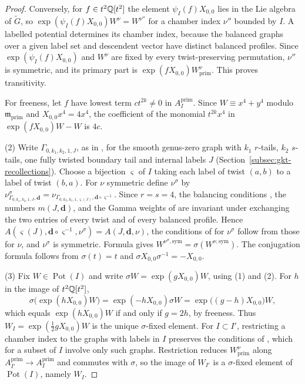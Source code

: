 \begin{proof}
Conversely, for $f\in t^2\mathbb Q[t^2]$ the element $\psi_I(f)X_{0,0}$ lies in the
Lie algebra of $\widetilde G$, so $\exp(\psi_I(f)X_{0,0})W^\nu=W^{\nu''}$ for a
chamber index $\nu''$ bounded by $I$.  A labelled potential determines its
chamber index, because the balanced graphs over a given label set and
descendent vector have distinct balanced profiles.  Since
$\exp(\psi_I(f)X_{0,0})$ and $W^\nu$ are fixed by every twist-preserving
permutation, $\nu''$ is symmetric, and its primary part is
$\exp(fX_{0,0})W^\nu_{\mathrm{prim}}$.  This proves transitivity.

For freeness, let $f$ have lowest term $ct^{2k}\neq0$ in
$A^{\mathrm{prim}}_I$.  Since $W\equiv x^4+y^4$ modulo
$\mathfrak m_{\mathrm{prim}}$ and $X_{0,0}x^4=4x^4$, the coefficient of the
monomial $t^{2k}x^4$ in $\exp(fX_{0,0})W-W$ is $4c$.

(2) Write $\Gamma_{0,k_1,k_2,1,J}$, as in
\cite[Notation~2.27]{grossetal2022open}, for the smooth genus-zero graph with
$k_1$ $r$-tails, $k_2$ $s$-tails, one fully twisted boundary tail and
internal labels $J$ (Section~\ref{subsec:gkt-recollections}).  Choose a
bijection $\varsigma$ of $I$ taking each label of twist $(a,b)$ to a label of
twist $(b,a)$.  For $\nu$ symmetric define $\nu^\sigma$ by
$\nu^\sigma_{\Gamma_{0,k_1,k_2,1,J},\mathbf d}
=\nu_{\Gamma_{0,k_2,k_1,1,\varsigma(J)},\mathbf d\circ\varsigma^{-1}}$.  Since
$r=s=4$, the balancing conditions \cite[Prop.~2.31]{grossetal2022open}, the
numbers $m(J,\mathbf d)$, and the Gamma weights of
\cite[Notation~3.42]{grossetal2022open} are invariant under exchanging the two
entries of every twist and of every balanced profile.  Hence
$A(\varsigma(J),\mathbf d\circ\varsigma^{-1},\nu^\sigma)=A(J,\mathbf d,\nu)$,
the conditions of \cite[Def.~3.47]{grossetal2022open} for $\nu^\sigma$ follow
from those for $\nu$, and $\nu^\sigma$ is symmetric.  Formula
\cite[(4.11)]{grossetal2022open} gives
$W^{\nu^\sigma,\mathrm{sym}}=\sigma(W^{\nu,\mathrm{sym}})$.  The conjugation
formula follows from $\sigma(t)=t$ and $\sigma X_{0,0}\sigma^{-1}=-X_{0,0}$.

(3) Fix $W\in\operatorname{Pot}(I)$ and write $\sigma W=\exp(gX_{0,0})W$, using (1)
and (2).  For $h$ in the image of $t^2\mathbb Q[t^2]$,
\[
 \sigma\bigl(\exp(hX_{0,0})W\bigr)
 =\exp(-hX_{0,0})\sigma W
 =\exp\bigl((g-h)X_{0,0}\bigr)W,
\]
which equals $\exp(hX_{0,0})W$ if and only if $g=2h$, by freeness.  Thus
$W_I=\exp(\tfrac12gX_{0,0})W$ is the unique $\sigma$-fixed element.  For
$I\subset I'$, restricting a chamber index to the graphs with labels in $I$
preserves the conditions of \cite[Def.~3.47]{grossetal2022open}, which for a
subset of $I$ involve only such graphs.  Restriction reduces
$W^\nu_{\mathrm{prim}}$ along $A^{\mathrm{prim}}_{I'}\to A^{\mathrm{prim}}_I$
and commutes with $\sigma$, so the image of $W_{I'}$ is a $\sigma$-fixed
element of $\operatorname{Pot}(I)$, namely $W_I$.
\end{proof}


